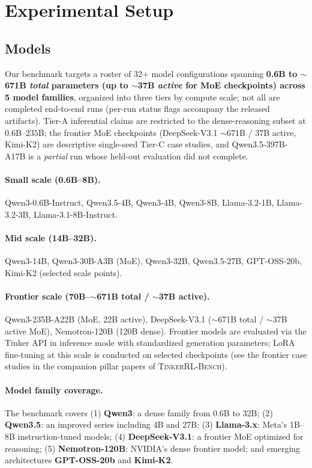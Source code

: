\documentclass{article}
\newcommand{\ours}{\textsc{TinkerRL-Bench}}
\begin{document}
\section{Experimental Setup}
\label{sec:setup}


\subsection{Models}

Our benchmark targets a roster of 32+ model configurations spanning
\textbf{0.6B to $\sim$671B \emph{total} parameters (up to $\sim$37B \emph{active}
for MoE checkpoints) across 5 model families}, organized into three
tiers by compute scale; not all are completed end-to-end runs (per-run
status flags accompany the released artifacts). Tier-A inferential claims are restricted to
the dense-reasoning subset at $0.6$B--$235$B; the frontier MoE
checkpoints (DeepSeek-V3.1 $\sim$671B / 37B active, Kimi-K2) are
descriptive single-seed Tier-C case studies, and Qwen3.5-397B-A17B is a
\emph{partial} run whose held-out evaluation did not complete.

\paragraph{Small scale (0.6B--8B).}
Qwen3-0.6B-Instruct, Qwen3.5-4B, Qwen3-4B, Qwen3-8B,
Llama-3.2-1B, Llama-3.2-3B, Llama-3.1-8B-Instruct.

\paragraph{Mid scale (14B--32B).}
Qwen3-14B, Qwen3-30B-A3B (MoE), Qwen3-32B, Qwen3.5-27B,
GPT-OSS-20b, Kimi-K2 (selected scale points).

\paragraph{Frontier scale (70B--$\sim$671B total / $\sim$37B active).}
Qwen3-235B-A22B (MoE, 22B active), DeepSeek-V3.1 ($\sim$671B total /
$\sim$37B active MoE), Nemotron-120B (120B dense).
Frontier models are evaluated via the Tinker API in inference mode
with standardized generation parameters; LoRA fine-tuning at this
scale is conducted on selected checkpoints (see the frontier case studies
in the companion pillar papers of \ours{}).

\paragraph{Model family coverage.}
The benchmark covers (1) \textbf{Qwen3}: a dense family from 0.6B to 32B;
(2) \textbf{Qwen3.5}: an improved series including 4B and 27B;
(3) \textbf{Llama-3.x}: Meta's 1B--8B instruction-tuned models;
(4) \textbf{DeepSeek-V3.1}: a frontier MoE optimized for reasoning;
(5) \textbf{Nemotron-120B}: NVIDIA's dense frontier model;
and emerging architectures \textbf{GPT-OSS-20b} and \textbf{Kimi-K2}.
\end{document}
